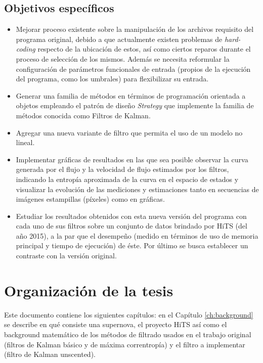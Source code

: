 \subsection{Objetivos espec\'ificos}

\begin{itemize}


\item Mejorar proceso existente sobre la manipulaci\'on de los archivos requisito del programa original, debido a que actualmente existen problemas de \textit{hard-coding} respecto de la ubicaci\'on de estos, as\'i como ciertos reparos durante el proceso de selecci\'on de los mismos. Adem\'as se necesita reformular la configuraci\'on de par\'ametros funcionales de entrada (propios de la ejecuci\'on del programa, como los umbrales) para flexibilizar su entrada. 
\bigskip

\item Generar una familia de m\'etodos en t\'erminos de programaci\'on orientada a objetos empleando el patr\'on de dise\~no \textit{Strategy} que implemente la familia de m\'etodos conocida como Filtros de Kalman.
\bigskip

\item Agregar una nueva variante de filtro que permita el uso de un modelo no lineal.
\bigskip

\item Implementar gr\'aficas de resultados en las que sea posible observar la curva generada por el flujo y la velocidad de flujo estimados por los filtros, indicando la entrop\'ia aproximada de la curva en el espacio de estados y visualizar la evoluci\'on de las mediciones y estimaciones tanto en secuencias de im\'agenes estampillas (p\'ixeles) como en gr\'aficas.    
\bigskip

\item Estudiar los resultados obtenidos con esta nueva versi\'on del programa con cada uno de sus filtros sobre un conjunto de datos brindado por HiTS (del a\~no 2015), a la par que el desempe\~no (medido en t\'erminos de uso de memoria principal y tiempo de ejecuci\'on) de \'este. Por \'ultimo se busca establecer un contraste con la versi\'on original.     

\end{itemize}
\section{Organizaci\'on de la tesis}

Este documento contiene los siguientes cap\'itulos: en el Cap\'itulo \ref{ch:background} se describe en qu\'e consiste una supernova, el proyecto HiTS  as\'i como el background matem\'atico de los m\'etodos de filtrado usados en el trabajo original (filtros de Kalman b\'asico y de m\'axima correntrop\'ia) y el filtro a implementar (filtro de Kalman unscented).%
\bigskip

